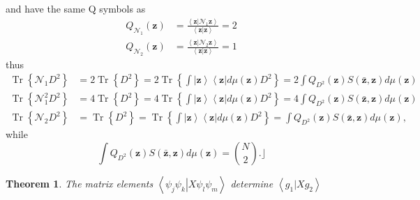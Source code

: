 \documentclass[aps,preprint]{revtex4}%
\newtheorem{theorem}{Theorem}
\begin{document}
and have the same Q symbols as
\begin{align*}
Q_{\mathcal{N}_{1}}\left(  \mathbf{z}\right)   &  =\frac{\left\langle
\mathbf{z}\left\vert \mathcal{N}_{1}\mathbf{z}\right.  \right\rangle
}{\left\langle \mathbf{z}\left\vert \mathbf{z}\right.  \right\rangle }=2\\
Q_{\mathcal{N}_{2}}\left(  \mathbf{z}\right)   &  =\frac{\left\langle
\mathbf{z}\left\vert \mathcal{N}_{2}\mathbf{z}\right.  \right\rangle
}{\left\langle \mathbf{z}\left\vert \mathbf{z}\right.  \right\rangle }=1
\end{align*}
thus
\begin{align}
\operatorname*{Tr}\left\{  \mathcal{N}_{1}D^{2}\right\}   &
=2\operatorname*{Tr}\left\{  D^{2}\right\}  =2\operatorname*{Tr}\left\{
\int\left\vert \mathbf{z}\right\rangle \left\langle \mathbf{z}\right\vert
d\mu\left(  \mathbf{z}\right)  D^{2}\right\}  =2\int Q_{D^{2}}\left(
\mathbf{z}\right)  S\left(  \mathbf{\bar{z},z}\right)  d\mu\left(
\mathbf{z}\right) \nonumber\\
\operatorname*{Tr}\left\{  \mathcal{N}_{1}^{2}D^{2}\right\}   &
=4\operatorname*{Tr}\left\{  D^{2}\right\}  =4\operatorname*{Tr}\left\{
\int\left\vert \mathbf{z}\right\rangle \left\langle \mathbf{z}\right\vert
d\mu\left(  \mathbf{z}\right)  D^{2}\right\}  =4\int Q_{D^{2}}\left(
\mathbf{z}\right)  S\left(  \mathbf{\bar{z},z}\right)  d\mu\left(
\mathbf{z}\right) \nonumber\\
\operatorname*{Tr}\left\{  \mathcal{N}_{2}D^{2}\right\}   &
=\operatorname*{Tr}\left\{  D^{2}\right\}  =\operatorname*{Tr}\left\{
\int\left\vert \mathbf{z}\right\rangle \left\langle \mathbf{z}\right\vert
d\mu\left(  \mathbf{z}\right)  D^{2}\right\}  =\int Q_{D^{2}}\left(
\mathbf{z}\right)  S\left(  \mathbf{\bar{z},z}\right)  d\mu\left(
\mathbf{z}\right)  ,
\end{align}
while%
\begin{equation}
\int Q_{D^{2}}\left(  \mathbf{z}\right)  S\left(  \mathbf{\bar{z},z}\right)
d\mu\left(  \mathbf{z}\right)  =\binom{N}{2}.\rfloor
\end{equation}


\begin{theorem}
The matrix elements $\left\langle \psi_{j}\psi_{k}\left\vert X\psi_{l}\psi
_{m}\right.  \right\rangle $ determine $\left\langle g_{1}\left\vert X\right.
g_{2}\right\rangle $
\end{theorem}

%
\end{document}
